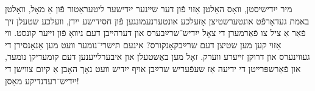 \documentclass[12pt, draft]{article}
\begin{document}
מיר ייִדישיסטן, װאָס האַלטן אַזױ פֿון דער שײנער ייִדישער ליטעראַטור פֿון אַ מאָל, װאָלטן באמת געדאַרפֿט אונטערשטיצן אַזעלכע אונטערנעמונגען פֿון חסידישע ייִדן, װעלכע שטעלן זיך פֿאַר אַ ציל צו פֿאַרמערן די צאָל ייִדיש־שרײַבערס און דערהײבן דעם ניװאָ פֿון זײער קונסט. װי אַזױ קען מען שטיצן דעם שרײַבקאָנקורס? אינעם תּישרי־נומער װעט מען אַנאָנסירן די געװינערס און דרוקן זײערע װערק. זאָל מען באַשטעלן און איבערלײענען דעם קומעדיקן נומער, און פֿאַרשפּרײטן די ידיעה אַז שעפֿעריש שרײַבן אױף ייִדיש װעט נאָך האָבן אַ קיום צװישן די ייִדיש־רעדנדיקע מאַסן!
\end{document}
